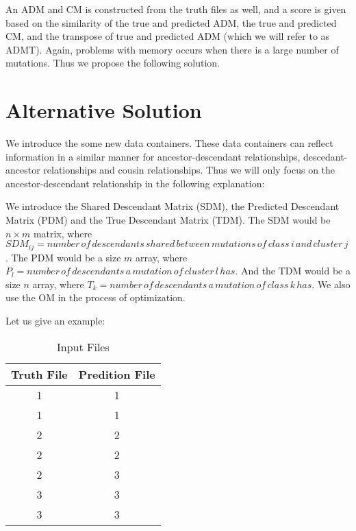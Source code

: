 \documentclass[a4paper, 11pt]{article}
\begin{document}
An ADM and CM is constructed from the truth files as well, and a score is given based on the similarity of the true and predicted ADM, the true and predicted CM, and the transpose of true and predicted ADM (which we will refer to as ADMT). Again, problems with memory occurs when there is a large number of mutations. Thus we propose the following solution.

\section*{Alternative Solution}
We introduce the some new data containers. These data containers can reflect information in a similar manner for ancestor-descendant relationships, descedant-ancestor relationships and cousin relationships. Thus we will only focus on the ancestor-descendant relationship in the following explanation: 

We introduce the Shared Descendant Matrix (SDM), the Predicted Descendant Matrix (PDM) and the True Descendant Matrix (TDM). The SDM would be $n \times m$ matrix, where $SDM_{ij} = number\,of\,descendants\,shared\,between\,mutations\,of\,class\,i\,and\,cluster\,j$. The PDM would be a size $m$ array, where $P_{l} = number\,of\,descendants\,a\,mutation\,of\,cluster\,l\,has$. And the TDM would be a size $n$ array, where $T_{k} = number\,of\,descendants\,a\,mutation\,of\,class\,k\,has$. We also use the OM in the process of optimization.

Let us give an example:

\begin{center}
    \begin{table}[ht]
    \centering
    \begin{tabular}{||c c||}
    \hline
    Truth File & Predition File \\ 
    \hline\hline
    1 & 1\\
    \hline
    1 & 1\\
    \hline
    2 & 2\\
    \hline
    2 & 2\\
    \hline
    2 & 3\\
    \hline
    3 & 3\\
    \hline
    3 & 3\\
    \hline
    \end{tabular}
    \caption{Input Files}
    \label{table:files}
    \end{table}
\end{center}
\end{document}
